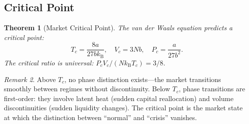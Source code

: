 \documentclass[twocolumn,10pt]{article}
\newtheorem{theorem}{Theorem}[section]
\theoremstyle{remark}
\newtheorem{remark}[theorem]{Remark}
\newcommand{\kB}{k_{\mathrm{B}}}
\begin{document}
\subsection{Critical Point}

\begin{theorem}[Market Critical Point]
\label{thm:critical_point}
The van der Waals equation predicts a critical point:
\begin{equation}
    T_c = \frac{8a}{27b\kB}, \quad V_c = 3Nb, \quad P_c = \frac{a}{27b^2}.
    \label{eq:critical_point}
\end{equation}
The critical ratio is universal: $P_c V_c / (N\kB T_c) = 3/8$.
\end{theorem}

\begin{remark}
Above $T_c$, no phase distinction exists---the market transitions smoothly between regimes without discontinuity.  Below $T_c$, phase transitions are first-order: they involve latent heat (sudden capital reallocation) and volume discontinuities (sudden liquidity changes).  The critical point is the market state at which the distinction between ``normal'' and ``crisis'' vanishes.
\end{remark}
\end{document}
